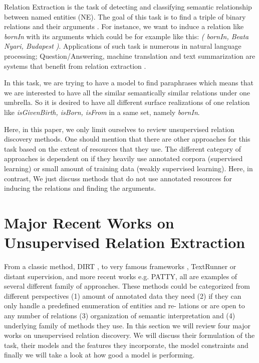 \documentclass[12pt]{report}
\begin{document}
Relation Extraction is the task of detecting and classifying semantic relationship 
between named entities (NE). The goal of this task is to find a triple
of binary relations and their arguments \cite{Androutsopoulos2009}. For instance, we want to induce a
relation like \emph{bornIn} with its arguments which could be for example like this:\emph{ (
bornIn, Beata Nyari, Budapest )}. Applications of such task is numerous
in natural language processing; Question/Answering, machine translation and
text summarization are systems that benefit from relation extraction \cite{Androutsopoulos2009}.

In this task, we are trying to have a model to find paraphrases which means
that we are interested to have all the similar semantically similar relations under
one umbrella. So it is desired to have all different surface realizations of one
relation like \emph{isGivenBirth, isBorn, isFrom} in a same set, namely \emph{bornIn}.

Here, in this paper, we only limit ourselves to review unsupervised relation discovery methods. 
One should mention that there are other approaches for this task based on the extent of resources that they use.
 The different category of approaches is dependent on if they heavily use annotated corpora (supervised learning) or 
 small amount of training data (weakly supervised learning). Here, in contrast, 
 We just discuss methods that do not use annotated resources for inducing the relations and finding the arguments. 



\chapter{Major Recent Works on Unsupervised Relation Extraction}
\label{ch:related}

From a classic method, DIRT \cite{Lin2001}, to very famous frameworks ,
TextRunner\cite{Bankoa} or distant supervision\cite{Mintz2009}, and more recent works e.g. PATTY\cite{Nakashole2012a},
all are examples of several different family of approaches. These methods could
be categorized from different perspectives (1) amount of annotated data they
need (2) if they can only handle a predefined enumeration of entities and re-
lations or are open to any number of relations (3) organization of semantic
interpretation and (4) underlying family of methods they use.
In this section we will review four major works on unsupervised relation discovery.
 We will discuss their formulation of the task, their models
 and the features they incorporate, the model constraints and finally we will take a look at how good a model is performing.
\end{document}
